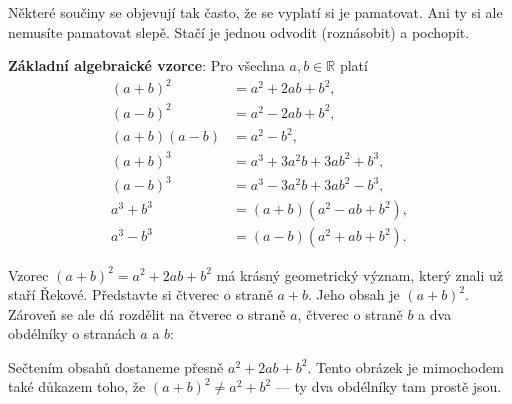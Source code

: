 Některé součiny se objevují tak často, že se vyplatí si je pamatovat. Ani ty si ale nemusíte pamatovat slepě. Stačí je jednou odvodit (roznásobit) a pochopit.

\begin{definitionbox}
  \textbf{Základní algebraické vzorce}: Pro všechna $a, b\in\mathbb{R}$ platí
  \begin{align*}
    {(a + b)}^2 &= a^2 + 2ab + b^2,\\
    {(a - b)}^2 &= a^2 - 2ab + b^2,\\
    (a + b)(a - b) &= a^2 - b^2,\\
    {(a + b)}^3 &= a^3 + 3a^2b + 3ab^2 + b^3,\\
    {(a - b)}^3 &= a^3 - 3a^2b + 3ab^2 - b^3,\\
    a^3 + b^3 &= (a + b)(a^2 - ab + b^2),\\
    a^3 - b^3 &= (a - b)(a^2 + ab + b^2).
  \end{align*}
\end{definitionbox}

\begin{example}\label{ex:vzorec-ctverec}
  Vzorec ${(a + b)}^2 = a^2 + 2ab + b^2$ má krásný geometrický význam, který znali už staří Řekové. Představte si čtverec o straně $a + b$. Jeho obsah je ${(a + b)}^2$. Zároveň se ale dá rozdělit na čtverec o straně $a$, čtverec o straně $b$ a dva obdélníky o stranách $a$ a $b$:
  \begin{center}
  \end{center}
  Sečtením obsahů dostaneme přesně $a^2 + 2ab + b^2$. Tento obrázek je mimochodem také důkazem toho, že ${(a + b)}^2 \neq a^2 + b^2$ --- ty dva obdélníky tam prostě jsou.
\end{example}


